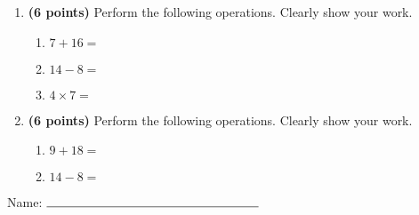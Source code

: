 \documentclass[12pt]{amsart}
\begin{document}
\newpage
\begin{enumerate}
\item {\bf (6 points)} 
 Perform the following operations. Clearly show your work. \begin{enumerate}


\def \a{7}\def \b{16}\def \apb{23}

 
\item $\a + \b = $

\vspace{2cm}
\def \a{14}\def \dif{6}\def \b{8}

 
\item $\a - \b = $

\vspace{2cm}
\def \a{4}\def \b{7}\def \ab{11}

 
\item $\a \times \b = $ 

\vspace{2cm}
\def \vshift{5}\def \hshift{4}\def \chang{-1}\def \findval{3}\def \yval{7}

 
\end{enumerate}


\newpage
\item {\bf (6 points)} 
 Perform the following operations. Clearly show your work. \begin{enumerate}


\def \a{9}\def \b{18}\def \apb{27}

 
\item $\a + \b = $

\vspace{2cm}
\def \a{14}\def \dif{6}\def \b{8}

 
\item $\a - \b = $

\vspace{2cm}
\def \vshift{-1}\def \hshift{-2}\def \chang{0}\def \findval{-2}\def \yval{-1}

 
\end{enumerate}


\newpage\end{enumerate}\graphicspath{{C:/Users/iainc/anaconda3/Randomizer/Sample Course/Sample Assessment 2/}}\setcounter{page}{1}


\thispagestyle{fancy}

 
\noindent Name: $\rule{6cm}{0.15mm}$

\vspace{.2cm}
\end{document}
